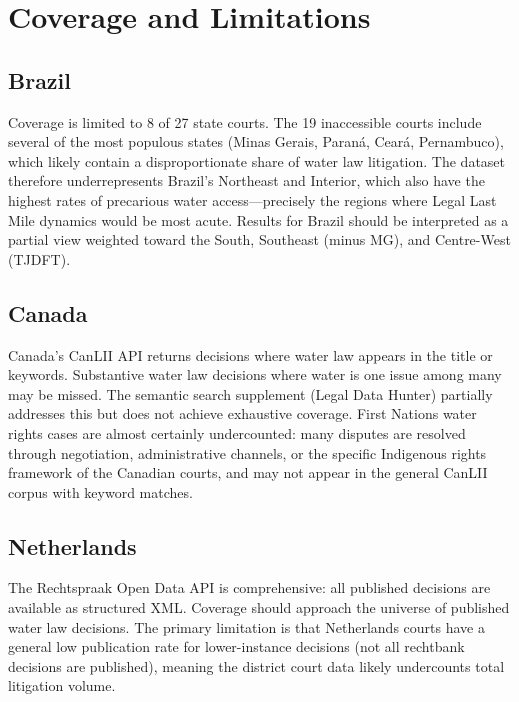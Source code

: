 \documentclass[12pt]{article}
\begin{document}
\section{Coverage and Limitations}

\subsection{Brazil}
Coverage is limited to 8 of 27 state courts. The 19 inaccessible courts include several of the most populous states (Minas Gerais, Paraná, Ceará, Pernambuco), which likely contain a disproportionate share of water law litigation. The dataset therefore underrepresents Brazil's Northeast and Interior, which also have the highest rates of precarious water access—precisely the regions where Legal Last Mile dynamics would be most acute. Results for Brazil should be interpreted as a partial view weighted toward the South, Southeast (minus MG), and Centre-West (TJDFT).

\subsection{Canada}
Canada's CanLII API returns decisions where water law appears in the title or keywords. Substantive water law decisions where water is one issue among many may be missed. The semantic search supplement (Legal Data Hunter) partially addresses this but does not achieve exhaustive coverage. First Nations water rights cases are almost certainly undercounted: many disputes are resolved through negotiation, administrative channels, or the specific Indigenous rights framework of the Canadian courts, and may not appear in the general CanLII corpus with keyword matches.

\subsection{Netherlands}
The Rechtspraak Open Data API is comprehensive: all published decisions are available as structured XML. Coverage should approach the universe of published water law decisions. The primary limitation is that Netherlands courts have a general low publication rate for lower-instance decisions (not all rechtbank decisions are published), meaning the district court data likely undercounts total litigation volume.

\end{document}
